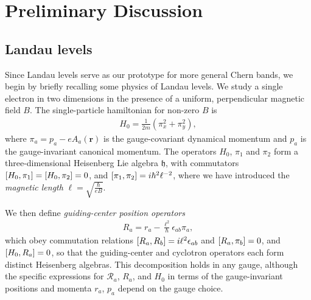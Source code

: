 \documentclass[aps,prb,twocolumn,letterpaper,twoside,nobalancelastpage,groupedaddress,amsmath,amssymb,floatfix,citeautoscript]{revtex4-1}
\begin{document}
\section{Preliminary Discussion}
\subsection{Landau levels}
\label{landau-level-review}
Since Landau levels serve as our prototype for more general Chern bands, we begin by briefly recalling some physics of Landau levels\cite{yoshioka_quantum_2002}. We study a single electron in two dimensions in the presence of a uniform, perpendicular magnetic field $B$. The single-particle hamiltonian for non-zero $B$ is
\begin{align}
\label{landau-hamiltonian}
H_0 = \frac{1}{2m}\left(\pi_x^2 + \pi_y^2\right),
\end{align}
where $\pi_a = p_a - e A_a(\mathbf{r})$ is the gauge-covariant dynamical momentum and $p_a$ is the gauge-invariant canonical momentum. The operators $H_0$, $\pi_1$ and $\pi_2$ form a three-dimensional Heisenberg Lie algebra $\mathfrak{h}$, with commutators $\comm{H_0}{\pi_1} = \comm{H_0}{\pi_2} = 0$, and $\comm{\pi_1}{\pi_2} = i\hbar^2\ell^{-2}$, where we have introduced the \textit{magnetic length} $\ell = \sqrt{\frac{\hbar}{eB}}.$


We then define \textit{guiding-center position operators}
\begin{align*}
R_a = r_a - \frac{\ell^2}{\hbar}\epsilon_{ab}\pi_a,
\end{align*}
which obey commutation relations $\comm{R_a}{R_b} = i\ell^2 \epsilon_{ab}$ and $\comm{R_a}{\pi_b} = 0$, and $\comm{H_0}{R_a} = 0$, so that the guiding-center and cyclotron operators each form distinct Heisenberg algebras. This decomposition holds in any gauge, although the specific expressions for $\mathcal{R}_a$, $R_a$, and $H_0$ in terms of the gauge-invariant positions and momenta $r_a$, $p_a$ depend on the gauge choice.
\end{document}
